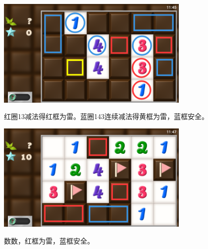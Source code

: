 \subsection{} %
\begin{center}
    \includegraphics[width=0.7\textwidth]{puzzle/169-1.png}
\end{center}
红圈13减法得红框为雷。蓝圈143连续减法得黄框为雷，蓝框安全。
\begin{center}
    \includegraphics[width=0.7\textwidth]{puzzle/169-2.png}
\end{center}
数数，红框为雷，蓝框安全。

